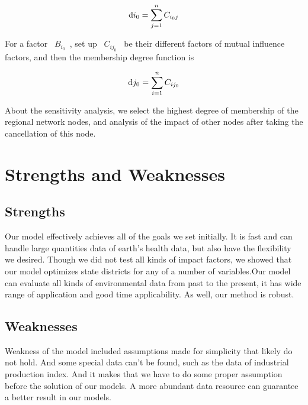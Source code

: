 \documentclass[a4paper,11pt]{article}
\begin{document}
\begin{equation}
{\rm d}i_{0}=\sum_{j=1}^{n}C_{i_{0}j}
\end{equation}
 

\par For a factor ~$B_{i_0}$~, set up ~$C_{ij_{0}}$~ be their different factors of mutual influence factors, and then the membership degree function is 

\begin{equation}
{\rm d}j_{0}=\sum_{i=1}^{n}C_{ij_{0}}
\end{equation}

\par About the sensitivity analysis, we select the highest degree of membership of the regional network nodes, and analysis of the impact of other nodes after taking the cancellation of this node.

\section{Strengths and Weaknesses}

\subsection{Strengths}
\par Our model effectively achieves all of the goals we set initially. It is fast and can handle large quantities data of earth's health data, but also have the flexibility we desired. Though we did not test all kinds of impact factors, we showed that our model optimizes state districts for any of a number of variables.Our model can evaluate all kinds of environmental data from past to the present, it has wide range of application and good time applicability. As well, our method is robust.

\subsection{Weaknesses}
\par Weakness of the model included assumptions made for simplicity that likely do not hold. And some special data can't be found, such as the data of industrial production index. And it makes that we have to do some proper assumption before the solution of our models. A more abundant data resource can guarantee a better result in our models.
\end{document}
